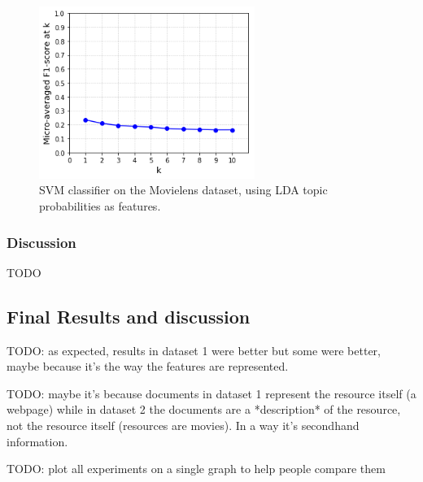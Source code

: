 \begin{figure}[H]
    \centering
    \includegraphics[width=7cm]{chapters/05_experiments/images/svm-lda-tf-idf-movielens.png}
    \caption{SVM classifier on the Movielens dataset, using LDA topic probabilities as features.}
    \label{fig:svm_lda_movielens}
\end{figure}

\subsubsection{Discussion}

{\color{red} TODO}

\subsection{Final Results and discussion}

{\color{red} TODO: as expected, results in dataset 1 were better but some were better, maybe because it's the way the features are represented.}

{\color{red} TODO: maybe it's because documents  in dataset 1 represent the resource itself (a webpage) while in dataset 2 the documents are a *description* of the resource, not the resource itself (resources are movies). In a way it's secondhand information.}

{\color{red} TODO: plot all experiments on a single graph to help people compare them}
